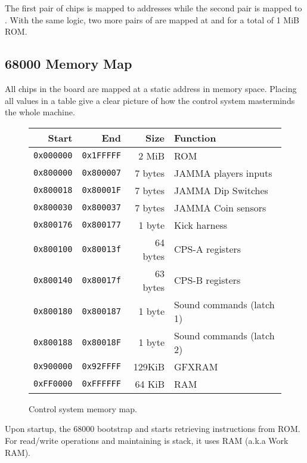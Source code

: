 The first pair of chips is mapped to addresses  while the second pair is mapped to . With the same logic, two more pairs of  are mapped at  and  for a total of 1 MiB ROM.




\subsection{68000 Memory Map}

All chips in the board are mapped at a static address in memory space. Placing all values in a table give a clear picture of how the control system masterminds the whole machine.

\begin{figure}[H]
{
\begin{tabularx}{\textwidth}{rrrX}
\toprule    
  \textbf{Start } & \textbf{End  } & \textbf{Size } & \textbf{Function } \\               
  \toprule    
  \texttt{0x000000} & \texttt{0x1FFFFF} & 2 MiB & ROM \\
  \toprule    
  \texttt{0x800000} & \texttt{0x800007} & 7 bytes & JAMMA players inputs \\
  \texttt{0x800018} & \texttt{0x80001F} & 7 bytes & JAMMA Dip Switches \\
  \texttt{0x800030} & \texttt{0x800037} & 7 bytes & JAMMA Coin sensors \\
  \texttt{0x800176} & \texttt{0x800177} & 1 byte & Kick harness \\
\toprule    
  \texttt{0x800100} & \texttt{0x80013f} & 64 bytes & CPS-A registers\\
  \texttt{0x800140} & \texttt{0x80017f} & 63 bytes & CPS-B registers\\
\toprule    
  \texttt{0x800180} & \texttt{0x800187} & 1 byte & Sound commands (latch 1)\\
  \texttt{0x800188} & \texttt{0x80018F} & 1 byte & Sound commands (latch 2)\\
  \toprule    
  \texttt{0x900000} & \texttt{0x92FFFF} & 129KiB & GFXRAM\\
  \texttt{0xFF0000} & \texttt{0xFFFFFF} & 64 KiB & RAM \\
  \toprule    
\end{tabularx}%
}\caption*{Control system memory map.}
\end{figure}

Upon startup, the 68000 bootstrap and starts retrieving instructions from ROM. For read/write operations and maintaining is stack, it uses RAM (a.k.a Work RAM). 

